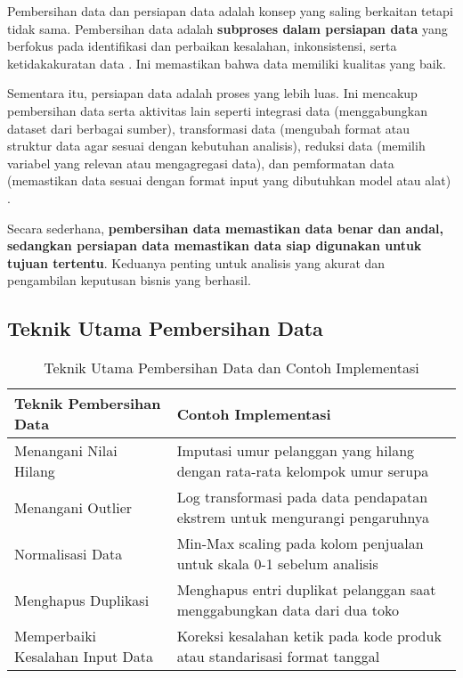 Pembersihan data dan persiapan data adalah konsep yang saling berkaitan tetapi tidak sama. Pembersihan data adalah \textbf{subproses dalam persiapan data} yang berfokus pada identifikasi dan perbaikan kesalahan, inkonsistensi, serta ketidakakuratan data \cite{kelleher2015fundamentals}. Ini memastikan bahwa data memiliki kualitas yang baik.

Sementara itu, persiapan data adalah proses yang lebih luas. Ini mencakup pembersihan data serta aktivitas lain seperti integrasi data (menggabungkan dataset dari berbagai sumber), transformasi data (mengubah format atau struktur data agar sesuai dengan kebutuhan analisis), reduksi data (memilih variabel yang relevan atau mengagregasi data), dan pemformatan data (memastikan data sesuai dengan format input yang dibutuhkan model atau alat) \cite{han2011data}.

Secara sederhana, \textbf{pembersihan data memastikan data benar dan andal, sedangkan persiapan data memastikan data siap digunakan untuk tujuan tertentu}. Keduanya penting untuk analisis yang akurat dan pengambilan keputusan bisnis yang berhasil.

\subsection{Teknik Utama Pembersihan Data}


\begin{table}[h]
	\centering
	\renewcommand{\arraystretch}{1.2}
	\begin{tabular}{|p{}|p{}|}
		\hline
		\textbf{Teknik Pembersihan Data} & \textbf{Contoh Implementasi} \\
		\hline
		Menangani Nilai Hilang & Imputasi umur pelanggan yang hilang dengan rata-rata kelompok umur serupa \\
		\hline
		Menangani Outlier & Log transformasi pada data pendapatan ekstrem untuk mengurangi pengaruhnya \\
		\hline
		Normalisasi Data & Min-Max scaling pada kolom penjualan untuk skala 0-1 sebelum analisis \\
		\hline
		Menghapus Duplikasi & Menghapus entri duplikat pelanggan saat menggabungkan data dari dua toko \\
		\hline
		Memperbaiki Kesalahan Input Data & Koreksi kesalahan ketik pada kode produk atau standarisasi format tanggal \\
		\hline
	\end{tabular}
	\caption{Teknik Utama Pembersihan Data dan Contoh Implementasi}
	\label{tab:teknik-pembersihan-data}
\end{table}



